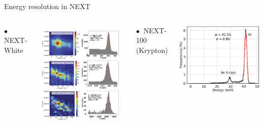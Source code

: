 \documentclass [aspectratio=169]{beamer}
\begin{document}
\begin{frame}{Energy resolution in NEXT}

\begin{columns}
$\bullet~$ NEXT-White

\includegraphics[scale=0.21]{eresWhite.png}

 $\bullet~$ NEXT-100 (Krypton) 
 
 \includegraphics[scale=0.23]{kr_energy_fiducial.jpeg}
 

\end{columns}
\end{frame}
\end{document}
